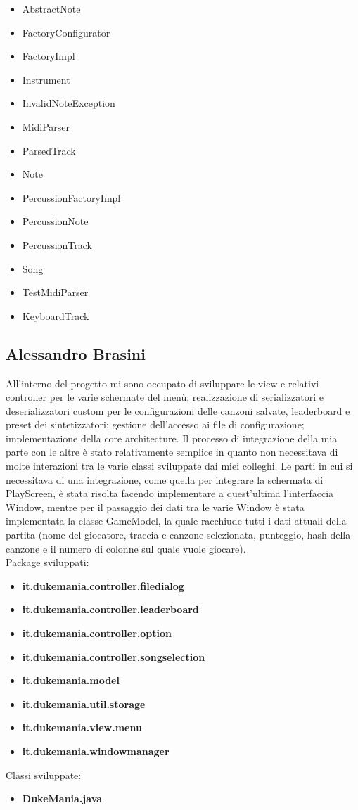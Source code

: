 \documentclass[a4paper,12pt]{report}
\begin{document}
{
\begin{itemize}
	\item AbstractNote
	\item FactoryConfigurator
	\item FactoryImpl
	\item Instrument
	\item InvalidNoteException
	\item MidiParser
	\item ParsedTrack
	\item Note
	\item PercussionFactoryImpl
	\item PercussionNote
	\item PercussionTrack
	\item Song
	\item TestMidiParser
	\item KeyboardTrack
\end{itemize}
}
\hfill\break
\newpage

\subsection{Alessandro Brasini}
All'interno del progetto mi sono occupato di sviluppare le view e relativi controller per le varie schermate del menù; realizzazione di serializzatori e 
deserializzatori custom per le configurazioni delle canzoni salvate, leaderboard e preset dei sintetizzatori; gestione dell'accesso ai file di configurazione;
implementazione della core architecture.
Il processo di integrazione della mia parte con le altre è stato relativamente semplice in quanto non necessitava di molte interazioni
tra le varie classi sviluppate dai miei colleghi. Le parti in cui si necessitava di una integrazione, come quella per integrare la schermata di PlayScreen,
è stata risolta facendo implementare a quest'ultima l'interfaccia Window, mentre per il passaggio dei dati tra le varie Window è stata implementata la 
classe GameModel, la quale racchiude tutti i dati attuali della partita (nome del giocatore, traccia e canzone selezionata, punteggio, hash della canzone e il numero di 
colonne sul quale vuole giocare). \\
Package sviluppati:
\begin{itemize}
	\item \textbf{it.dukemania.controller.filedialog}
	\item \textbf{it.dukemania.controller.leaderboard}
	\item \textbf{it.dukemania.controller.option}
	\item \textbf{it.dukemania.controller.songselection}
	\item \textbf{it.dukemania.model}
	\item \textbf{it.dukemania.util.storage}
	\item \textbf{it.dukemania.view.menu}
	\item \textbf{it.dukemania.windowmanager}
\end{itemize}
Classi sviluppate:
\begin{itemize}
	\item \textbf{DukeMania.java}
\end{itemize}
\newpage
\end{document}
